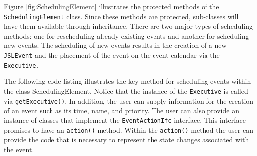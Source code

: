 \documentclass[
]{book}
\theoremstyle{definition}
\theoremstyle{definition}
\theoremstyle{definition}
\theoremstyle{definition}
\theoremstyle{remark}
\begin{document}
Figure \ref{fig:SchedulingElement} illustrates the protected methods of
the \texttt{SchedulingElement} class. Since these methods are protected,
sub-classes will have them available through inheritance. There are two
major types of scheduling methods: one for rescheduling already existing
events and another for scheduling new events. The scheduling of new
events results in the creation of a new \texttt{JSLEvent} and the placement of
the event on the event calendar via the \texttt{Executive.}

The following code listing illustrates the key method for
scheduling events within the class SchedulingElement. Notice that the instance of the \texttt{Executive} is called via \texttt{getExecutive()}. In addition, the user can supply information for the
creation of an event such as its time, name, and priority. The user can
also provide an instance of classes that implement the \texttt{EventActionIfc}
interface. This interface promises to have an \texttt{action()} method. Within
the \texttt{action()} method the user can provide the code that is necessary to
represent the state changes associated with the event.
\end{document}
